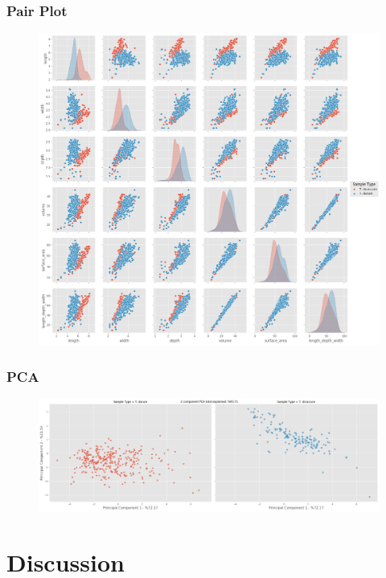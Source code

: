 \documentclass[11pt]{report}
\begin{document}
\subsection{Pair Plot}
\label{sec:org5b6f011}

\begin{figure}[htbp]
\centering
\includegraphics[width=18cm]{./images/results/group5/pairplot.png}
\label{fig:orge11940e}
\end{figure}

\clearpage
\subsection{PCA}
\label{sec:orgc47f639}
\begin{figure}[htbp]
\centering
\includegraphics[width=18cm]{./images/results/group5/pca.png}
\label{fig:orga940699}
\end{figure}




\clearpage
\chapter{Discussion}
\label{sec:org2bf4e17}
\end{document}
